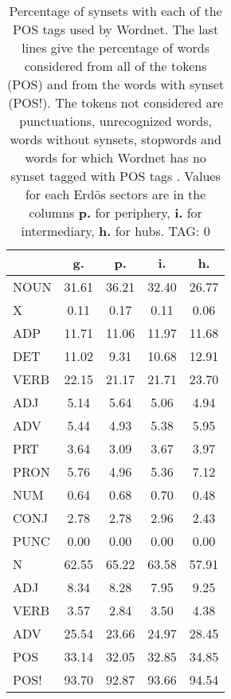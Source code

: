\begin{table}[h!]
\begin{center}
\begin{tabular}{| l || c | c | c | c |}\hline
 & {\bf g.} & {\bf p.} & {\bf i.} & {\bf h.} \\\hline\hline
NOUN & 31.61  & 36.21  & 32.40  & 26.77 \\
X & 0.11  & 0.17  & 0.11  & 0.06 \\\hline
ADP & 11.71  & 11.06  & 11.97  & 11.68 \\
DET & 11.02  & 9.31  & 10.68  & 12.91 \\\hline
VERB & 22.15  & 21.17  & 21.71  & 23.70 \\\hline
ADJ & 5.14  & 5.64  & 5.06  & 4.94 \\
ADV & 5.44  & 4.93  & 5.38  & 5.95 \\\hline
PRT & 3.64  & 3.09  & 3.67  & 3.97 \\
PRON & 5.76  & 4.96  & 5.36  & 7.12 \\
NUM & 0.64  & 0.68  & 0.70  & 0.48 \\
CONJ & 2.78  & 2.78  & 2.96  & 2.43 \\
PUNC & 0.00  & 0.00  & 0.00  & 0.00 \\\hline\hline\hline
N & 62.55  & 65.22  & 63.58  & 57.91 \\\hline
ADJ & 8.34  & 8.28  & 7.95  & 9.25 \\\hline
VERB & 3.57  & 2.84  & 3.50  & 4.38 \\\hline
ADV & 25.54  & 23.66  & 24.97  & 28.45 \\\hline\hline
POS & 33.14  & 32.05  & 32.85  & 34.85 \\\hline
POS! & 93.70  & 92.87  & 93.66  & 94.54 \\\hline
\end{tabular}
\caption{Percentage of synsets with each of the POS tags used by Wordnet. The last lines give the percentage of words considered from all of the tokens (POS) and from the words with synset (POS!). The tokens not considered are punctuations, unrecognized words, words without synsets, stopwords and words for which Wordnet has no synset  tagged with POS tags . Values for each Erd\"os sectors are in the columns {{\bf p.}} for periphery, {{\bf i.}} for intermediary, {{\bf h.}} for hubs. TAG: 0}
\end{center}
\end{table}